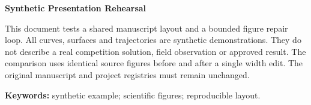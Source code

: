 \begin{center}
{\Large\bfseries Synthetic Presentation Rehearsal}\end{center}
This document tests a shared manuscript layout and a bounded figure repair loop.
All curves, surfaces and trajectories are synthetic demonstrations. They do not
describe a real competition solution, field observation or approved result.
The comparison uses identical source figures before and after a single width edit.
The original manuscript and project registries must remain unchanged.
\par\textbf{Keywords:} synthetic example; scientific figures; reproducible layout.
